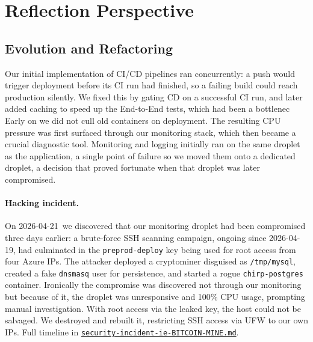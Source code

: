 \sloppy \section{Reflection Perspective}

\subsection{Evolution and Refactoring}

Our initial implementation of CI/CD pipelines ran concurrently: a push would trigger  
deployment before its CI run had finished, so a failing build could reach production silently. 
We fixed this by gating CD on a successful CI run, and later added caching to speed up the End-to-End 
tests, which had been a bottlenec \\
Early on we did not cull old containers on deployment. The resulting CPU pressure 
was first surfaced through our monitoring stack, which then became a crucial diagnostic tool. 
Monitoring and logging initially ran on the same droplet as the application, a single point of failure
so we moved them onto a dedicated droplet, a decision that proved fortunate 
when that droplet was later compromised.


\paragraph{Hacking incident.} \label{sec:hacking-incident} On 2026-04-21 we discovered that our monitoring droplet had been compromised three 
days earlier: a brute-force SSH scanning campaign, ongoing since 2026-04-19, had culminated in 
the \texttt{preprod-deploy} key being used for root access from four Azure IPs. The attacker 
deployed a cryptominer disguised as \texttt{/tmp/mysql}, created a fake \texttt{dnsmasq} user 
for persistence, and started a rogue \texttt{chirp-postgres} container. Ironically the compromise 
was discovered not through our monitoring but because of it, the droplet was unresponsive and 
100\% CPU usage, prompting manual investigation. With root access via the 
leaked key, the host could not be salvaged. We destroyed and rebuilt it, restricting SSH 
access via UFW to our own IPs. Full timeline in 
\href{https://github.com/sebseb10/ITU-MiniTwit/blob/main/security-incident-ie-BITCOIN-MINE.md}{\texttt{security-incident-ie-BITCOIN-MINE.md}}.

